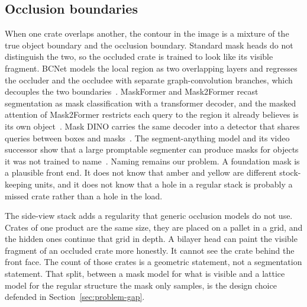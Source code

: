 \subsection{Occlusion boundaries}
\label{sec:occlusion-principles}

When one crate overlaps another, the contour in the image is a mixture of the true object boundary and the occlusion boundary. Standard mask heads do not distinguish the two, so the occluded crate is trained to look like its visible fragment. BCNet models the local region as two overlapping layers and regresses the occluder and the occludee with separate graph-convolution branches, which decouples the two boundaries~\cite{ke2021bcnet}. MaskFormer and Mask2Former recast segmentation as mask classification with a transformer decoder, and the masked attention of Mask2Former restricts each query to the region it already believes is its own object~\cite{cheng2021maskformer,cheng2022mask2former}. Mask DINO carries the same decoder into a detector that shares queries between boxes and masks~\cite{zhang2023maskdino}. The segment-anything model and its video successor show that a large promptable segmenter can produce masks for objects it was not trained to name~\cite{kirillov2023sam,ravi2024sam2}. Naming remains our problem. A foundation mask is a plausible front end. It does not know that amber and yellow are different stock-keeping units, and it does not know that a hole in a regular stack is probably a missed crate rather than a hole in the load.

The side-view stack adds a regularity that generic occlusion models do not use. Crates of one product are the same size, they are placed on a pallet in a grid, and the hidden ones continue that grid in depth. A bilayer head can paint the visible fragment of an occluded crate more honestly. It cannot see the crate behind the front face. The count of those crates is a geometric statement, not a segmentation statement. That split, between a mask model for what is visible and a lattice model for the regular structure the mask only samples, is the design choice defended in Section~\ref{sec:problem-gap}.

